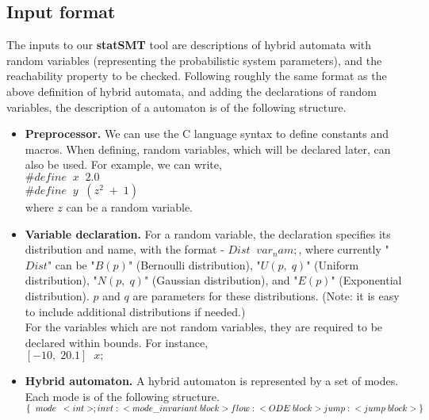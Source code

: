 \documentclass[runningheads,a4paper]{llncs}
\begin{document}
\subsection{Input format}
The inputs to our {\bf statSMT} tool are descriptions of hybrid automata with random variables (representing the probabilistic system parameters), and the reachability property to be checked. Following roughly the same format as the above definition of hybrid automata, and adding the declarations of random variables, the description of a automaton is of the following structure.
\begin{itemize}
\item {\bf Preprocessor.} We can use the C language syntax to define constants and macros. When defining, random variables, which will be declared later, can also be used. For example, we can write,\\

$\#define\;\; x \;\;2.0$\\
$\#define\;\; y\;\; (z^2 \;+\; 1)$\\

where $z$ can be a random variable.\\

\item {\bf Variable declaration.} For a random variable, the declaration specifies its distribution and name, with the format - $Dist \; \; var_nam;$, where currently "$Dist$" can be "$B(p)$" (Bernoulli distribution), "$U(p, \;q)$" (Uniform distribution), "$N(p, \;q)$" (Gaussian distribution), and "$E(p)$" (Exponential distribution). $p$ and $q$ are parameters for these distributions. (Note: it is easy to include additional distributions if needed.)\\
For the variables which are not random variables, they are required to be declared within bounds. For instance,\\
$[-10, \; 20.1]\; \;  x;$\\

\item {\bf Hybrid automaton.} A hybrid automaton is represented by a set of modes. Each mode is of the following structure.\\

$
\{\;\; mode \;\; <int>;\\
invt: \;\; <mode\_invariant\; block>\\
flow: \;\; <ODE\; block>\\
jump: \;\; <jump\;block>\\
\}
$\\


\end{itemize}
\end{document}
